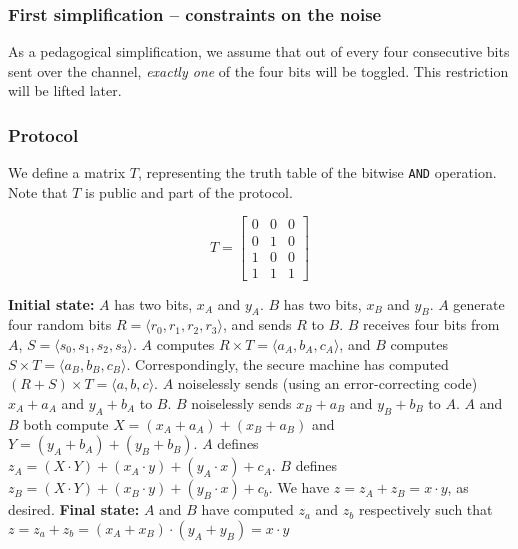 \subsubsection{First simplification -- constraints on the noise}

As a pedagogical simplification, we assume that out of every four consecutive bits sent over the channel, \textit{exactly one} of the four bits will be toggled. This restriction will be lifted later. 

\subsubsection{Protocol}

We define a matrix $T$, representing the truth table of the bitwise \texttt{AND} operation. Note that $T$ is public and part of the protocol.

\[T = 
\begin{bmatrix}
0 & 0 & 0 \\
0 & 1 & 0 \\
1 & 0 & 0 \\
1 & 1 & 1
\end{bmatrix}
\]

\begin{algorithm}
\label{a-enc-h}
\begin{algorithmic}[1]
\State \textbf{Initial state:} $A$ has two bits, $x_A$ and $y_A$. $B$ has two bits, $x_B$ and $y_B$.
\State $A$ generate four random bits $R = \langle r_0, r_1, r_2, r_3 \rangle$, and sends $R$ to $B$.
\State $B$ receives four bits from $A$, $S = \langle  s_0, s_1, s_2, s_3 \rangle$.
\State $A$ computes $R \times T = \langle a_A, b_A, c_A \rangle$, and $B$ computes $S \times T = \langle a_B, b_B, c_B \rangle$. Correspondingly, the secure machine has computed $(R + S) \times T = \langle a, b, c \rangle $.
\State $A$ noiselessly sends (using an error-correcting code) $x_A + a_A$ and $y_A + b_A$ to $B$. $B$ noiselessly sends $x_B + a_B$ and $y_B + b_B$ to $A$.
\State $A$ and $B$ both compute $X = (x_A + a_A) + (x_B + a_B)$ and $Y = (y_A + b_A) + (y_B + b_B)$.
\State $A$ defines $z_A = (X \cdot Y) + (x_A \cdot y) + (y_A \cdot x) + c_A$.
\State $B$ defines $z_B = (X \cdot Y) + (x_B \cdot y) + (y_B \cdot x) + c_b$. We have $z = z_A + z_B = x \cdot y$, as desired.
\State \textbf{Final state:} $A$ and $B$ have computed $z_a$ and $z_b$ respectively such that $z = z_a + z_b = (x_A + x_B) \cdot (y_A + y_B) = x \cdot y$
\end{algorithmic}
\end{algorithm}

